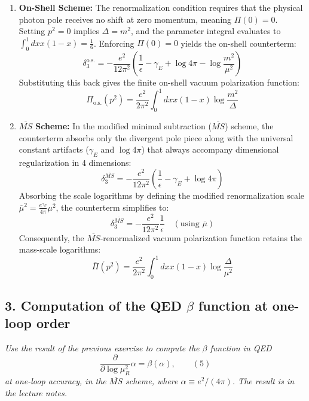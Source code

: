\begin{enumerate}
    \item \textbf{On-Shell Scheme:}
          The renormalization condition requires that the physical photon pole receives no shift at zero momentum, meaning $\Pi(0) = 0$.
          Setting $p^2 = 0$ implies $\Delta = m^2$, and the parameter integral evaluates to $\int_0^1 dx x(1-x) = \frac{1}{6}$. Enforcing $\Pi(0) = 0$ yields the on-shell counterterm:
          \[
              \delta_3^{\text{o.s.}} = -\frac{e^2}{12\pi^2} \left( \frac{1}{\epsilon} - \gamma_E + \log 4\pi - \log \frac{m^2}{\mu^2} \right)
          \]
          Substituting this back gives the finite on-shell vacuum polarization function:
          \[
              \Pi_{\text{o.s.}}(p^2) = \frac{e^2}{2\pi^2} \int_0^1 dx x(1-x) \log \frac{m^2}{\Delta}
          \]

    \item \textbf{$\overline{MS}$ Scheme:}
          In the modified minimal subtraction ($\overline{MS}$) scheme, the counterterm absorbs only the divergent pole piece along with the universal constant artifacts ($\gamma_E$ and $\log 4\pi$) that always accompany dimensional regularization in 4 dimensions:
          \[
              \delta_3^{\overline{MS}} = -\frac{e^2}{12\pi^2} \left( \frac{1}{\epsilon} - \gamma_E + \log 4\pi \right)
          \]
          Absorbing the scale logarithms by defining the modified renormalization scale $\overline{\mu}^2 = \frac{e^{\gamma_E}}{4\pi} \mu^2$, the counterterm simplifies to:
          \[
              \delta_3^{\overline{MS}} = -\frac{e^2}{12\pi^2} \frac{1}{\epsilon} \quad (\text{using } \overline{\mu})
          \]
          Consequently, the $\overline{MS}$-renormalized vacuum polarization function retains the mass-scale logarithms:
          \[
              \overline{\Pi}(p^2) = \frac{e^2}{2\pi^2} \int_0^1 dx x(1-x) \log \frac{\Delta}{\mu^2}
          \]
\end{enumerate}


\subsection*{3. Computation of the QED $\beta$ function at one-loop order}

\begin{center}
    \textit{Use the result of the previous exercise to compute the $\beta$ function in QED}
    \[
        \frac{\partial}{\partial \log \mu_R^2} \alpha = \beta(\alpha), \qquad (5)
    \]
    \textit{at one-loop accuracy, in the $\overline{MS}$ scheme, where $\alpha \equiv e^2 / (4\pi)$. The result is in the lecture notes.}
\end{center}

